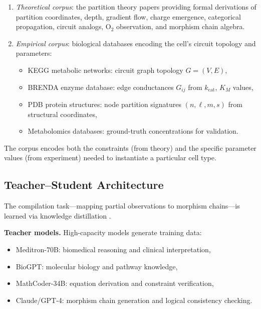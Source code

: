 \documentclass[twocolumn,10pt,a4paper]{article}
\theoremstyle{definition}
\theoremstyle{remark}
\begin{document}
\begin{enumerate}[label=(\arabic*)]
    \item \emph{Theoretical corpus}: the partition theory papers \citep{Sachikonye2024a,Sachikonye2024b,Sachikonye2024c,Sachikonye2024d,Sachikonye2024e,Sachikonye2024f} providing formal derivations of partition coordinates, depth, gradient flow, charge emergence, categorical propagation, circuit analogs, O$_2$ observation, and morphism chain algebra.
    \item \emph{Empirical corpus}: biological databases encoding the cell's circuit topology and parameters:
    \begin{itemize}[nosep]
        \item KEGG metabolic networks: circuit graph topology $G = (V, E)$,
        \item BRENDA enzyme database: edge conductances $G_{ij}$ from $k_{\mathrm{cat}}$, $K_M$ values,
        \item PDB protein structures: node partition signatures $(n, \ell, m, s)$ from structural coordinates,
        \item Metabolomics databases: ground-truth concentrations for validation.
    \end{itemize}
\end{enumerate}

The corpus encodes both the constraints (from theory) and the specific parameter values (from experiment) needed to instantiate a particular cell type.

\subsection{Teacher--Student Architecture}

The compilation task---mapping partial observations to morphism chains---is learned via knowledge distillation \citep{Hinton2015}.

\textbf{Teacher models.} High-capacity models generate training data:
\begin{itemize}[nosep]
    \item Meditron-70B: biomedical reasoning and clinical interpretation,
    \item BioGPT: molecular biology and pathway knowledge,
    \item MathCoder-34B: equation derivation and constraint verification,
    \item Claude/GPT-4: morphism chain generation and logical consistency checking.
\end{itemize}
\end{document}
